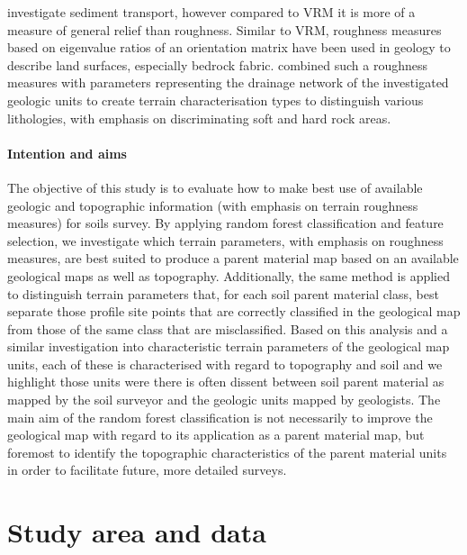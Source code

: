 \documentclass[preprint,12pt,authoryear]{elsarticle}
\begin{document}
investigate sediment transport, however compared to VRM  it is more of a measure of general relief than roughness. Similar to VRM, roughness measures based on eigenvalue ratios of an orientation matrix have been used in geology to describe land surfaces, especially bedrock fabric. \cite{Coblentz2014} combined such a roughness measures with parameters representing the drainage network of the investigated geologic units  to create terrain characterisation types to distinguish various lithologies, with emphasis on discriminating soft and hard rock areas.

\paragraph{Intention and aims}
The objective of this study is to evaluate how to make best use of available geologic and topographic information (with emphasis on terrain roughness measures) for soils survey. By applying random forest classification and feature selection, we investigate which terrain parameters, with emphasis on roughness measures, are best suited to produce a parent material map based on an available geological maps as well as topography. Additionally, the same method is applied to distinguish terrain parameters that, for each soil parent material class, best separate those profile site points that are correctly classified in the geological map from those of the same class that are misclassified. Based on this analysis and a similar investigation into characteristic terrain parameters of the geological map units, each of these is characterised with regard to topography and soil and we highlight those units were there is often dissent between soil parent material as mapped by the soil surveyor and the geologic units mapped by geologists. The main aim of the random forest classification is not necessarily to improve the geological map with regard to its application as a parent material map, but foremost to identify the topographic characteristics of the parent material units in order to facilitate future, more detailed surveys.

\section{Study area and data}
\end{document}
